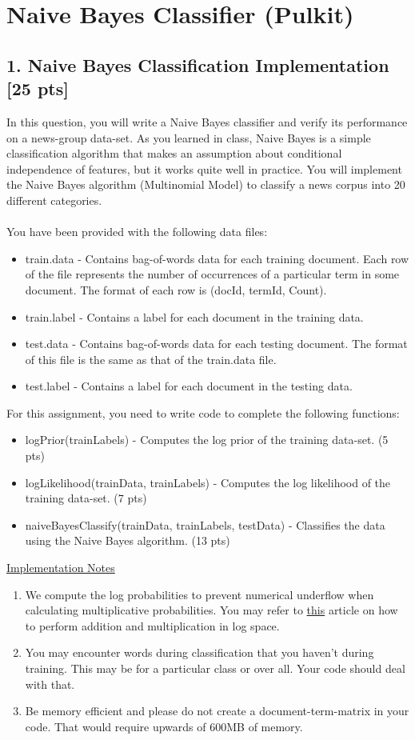 \documentclass{article}
\newcounter{homeworkProblemCounter} %
\newcommand{\homeworkProblemName}{}
\newenvironment{homeworkProblem}[1][Problem \arabic{homeworkProblemCounter}]{ %
\stepcounter{homeworkProblemCounter} %
\renewcommand{\homeworkProblemName}{#1} %
\section{\homeworkProblemName} %
}{
}
\newcommand{\homeworkSectionName}{}
\newenvironment{homeworkSection}[1]{ %
\renewcommand{\homeworkSectionName}{#1} %
\subsection{\homeworkSectionName} %
}{
}
\begin{document}
\begin{homeworkProblem}[Naive Bayes Classifier (Pulkit)] %
\begin{homeworkSection}{1. Naive Bayes Classification Implementation [25 pts]}
In this question, you will write a Naive Bayes classifier and verify its performance on a news-group data-set. As you learned in class, Naive Bayes is a simple classification algorithm that makes an assumption about conditional independence of features, but it works quite well in practice. You will implement the Naive Bayes algorithm (Multinomial Model) to classify a news corpus into 20 different categories. \\ \\
You have been provided with the following data files:
\begin{itemize}
\item train.data - Contains bag-of-words data for each training document. Each row of the file represents the number of occurrences of a particular term in some document. The format of each row is (docId, termId, Count).
\item train.label - Contains a label for each document in the training data.
\item test.data - Contains bag-of-words data for each testing document. The format of this file is the same as that of the train.data file.
\item test.label - Contains a label for each document in the testing data.
\end{itemize}

For this assignment, you need to write code to complete the following functions:
\begin{itemize}
\item logPrior(trainLabels) - Computes the log prior of the training data-set. (5 pts)
\item logLikelihood(trainData, trainLabels) - Computes the log likelihood of the training data-set. (7 pts)
\item naiveBayesClassify(trainData, trainLabels, testData) - Classifies the data using the Naive Bayes algorithm. (13 pts)
\end{itemize}

\underline{Implementation Notes}
\begin{enumerate}
\item We compute the log probabilities to prevent numerical underflow when calculating multiplicative probabilities. You may refer to \href{http://blog.smola.org/post/987977550/log-probabilities-semirings-and-floating-point-numbers}{this} article on how to perform addition and 
multiplication in log space. 
\item You may encounter words during classification that you haven't during training. This may be for a particular class or over all. Your code should deal with that. 
\item Be memory efficient and please do not create a document-term-matrix in your code. That would require upwards of 600MB of memory.
\end{enumerate}


\end{homeworkSection}
\end{homeworkProblem}
\end{document}
